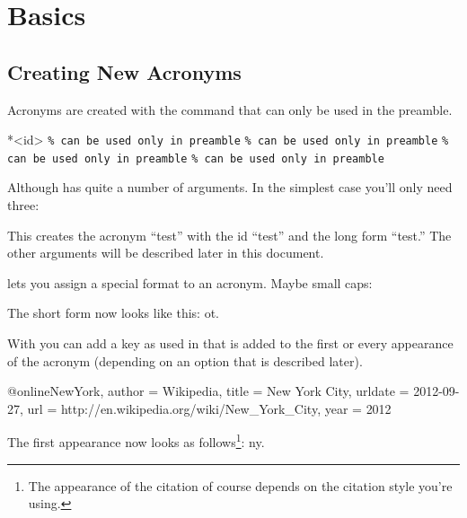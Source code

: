 \documentclass[DIV10,toc=index,toc=bib,hyperfootnotes=false]{cnpkgdoc}
\begin{document}
\section{Basics}
\subsection{Creating New Acronyms}
Acronyms are created with the command  that can only be used
in the preamble.
\begin{beschreibung}
 *{<id>}
 \verb+% can be used only in preamble+
  \verb+% can be used only in preamble+
   \verb+% can be used only in preamble+
   \verb+% can be used only in preamble+
\end{beschreibung}
Although  has quite a number of arguments. In the simplest
case you'll only need three:
\begin{beispiel}
\end{beispiel}
This creates the acronym ``\acs{test}'' with the \acs{id} ``test'' and the long
form ``\acl{test}.'' The other arguments will be described later in this document.

 lets you assign a special format to an acronym. Maybe
small caps:
\begin{beispiel}
\end{beispiel}
The short form now looks like this: \acs{ot}.

With  you can add a key as used in  that
is added to the first or every appearance of the acronym (depending on an option
that is described later).
\begin{beispiel}
 @online{NewYork,
   author  = {Wikipedia},
   title   = {New York City},
   urldate = {2012-09-27},
   url     = {http://en.wikipedia.org/wiki/New_York_City},
   year    = {2012}
 }
\end{beispiel}
The first appearance now looks as follows\footnote{The appearance of the citation
of course depends on the citation style you're using.}: \acf{ny}.
\end{document}
